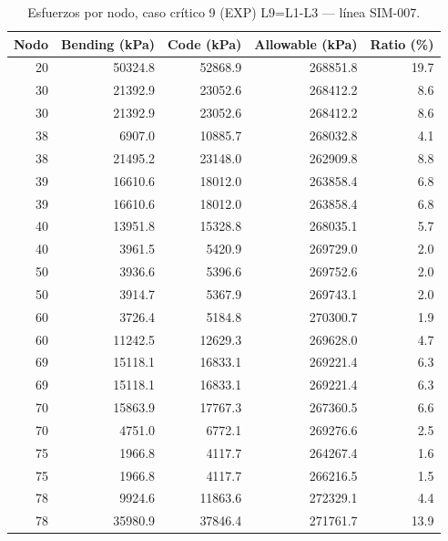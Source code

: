 \begin{table}[htbp]
  \centering
  \footnotesize
  \caption{Esfuerzos por nodo, caso crítico 9 (EXP) L9=L1-L3 — línea SIM-007.}
  \label{tab:esfuerzos-critico}
  \begin{tabular}{rrrrr}
    \toprule
    Nodo & Bending (\si{kPa}) & Code (\si{kPa}) & Allowable (\si{kPa}) & Ratio (\%) \\
    \midrule
    20 & \num{50324.8} & \num{52868.9} & \num{268851.8} & 19.7 \\
    30 & \num{21392.9} & \num{23052.6} & \num{268412.2} & 8.6 \\
    30 & \num{21392.9} & \num{23052.6} & \num{268412.2} & 8.6 \\
    38 & \num{6907.0} & \num{10885.7} & \num{268032.8} & 4.1 \\
    38 & \num{21495.2} & \num{23148.0} & \num{262909.8} & 8.8 \\
    39 & \num{16610.6} & \num{18012.0} & \num{263858.4} & 6.8 \\
    39 & \num{16610.6} & \num{18012.0} & \num{263858.4} & 6.8 \\
    40 & \num{13951.8} & \num{15328.8} & \num{268035.1} & 5.7 \\
    40 & \num{3961.5} & \num{5420.9} & \num{269729.0} & 2.0 \\
    50 & \num{3936.6} & \num{5396.6} & \num{269752.6} & 2.0 \\
    50 & \num{3914.7} & \num{5367.9} & \num{269743.1} & 2.0 \\
    60 & \num{3726.4} & \num{5184.8} & \num{270300.7} & 1.9 \\
    60 & \num{11242.5} & \num{12629.3} & \num{269628.0} & 4.7 \\
    69 & \num{15118.1} & \num{16833.1} & \num{269221.4} & 6.3 \\
    69 & \num{15118.1} & \num{16833.1} & \num{269221.4} & 6.3 \\
    70 & \num{15863.9} & \num{17767.3} & \num{267360.5} & 6.6 \\
    70 & \num{4751.0} & \num{6772.1} & \num{269276.6} & 2.5 \\
    75 & \num{1966.8} & \num{4117.7} & \num{264267.4} & 1.6 \\
    75 & \num{1966.8} & \num{4117.7} & \num{266216.5} & 1.5 \\
    78 & \num{9924.6} & \num{11863.6} & \num{272329.1} & 4.4 \\
    78 & \num{35980.9} & \num{37846.4} & \num{271761.7} & 13.9 \\

\end{tabular}
\end{table}
